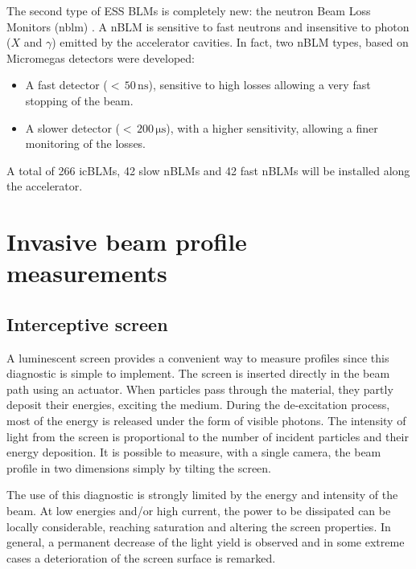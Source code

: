 \begin{refsection}
  The second type of ESS BLMs is completely new: the neutron Beam Loss Monitors (\acrshort{nblm}) \cite{Papaevangelou:HB2018-THA1WE04}.
  A nBLM is sensitive to fast neutrons and insensitive to photon ($X$ and $\gamma$) emitted by the accelerator cavities. In fact, two nBLM types, based on Micromegas detectors \cite{GIOMATARIS199629} were developed:
  \begin{itemize}
    \item A fast detector ($<\,50\,\mathrm{ns}$), sensitive to high losses allowing a very fast stopping of the beam.
    \item A slower detector ($<\,200\,\mathrm{\mu s}$), with a higher sensitivity, allowing a finer monitoring of the losses.
  \end{itemize}

  A total of 266 icBLMs, 42 slow nBLMs and 42 fast nBLMs will be installed along the accelerator.


  \section{Invasive beam profile measurements}
  \subsection{Interceptive screen}
  A luminescent screen provides a convenient way to measure profiles since this diagnostic is simple to implement. The screen is inserted directly in the beam path using an actuator. When particles pass through the material, they partly deposit their energies, exciting the medium. During the de-excitation process, most of the energy is released under the form of visible photons. The intensity of light from the screen is proportional to the number of incident particles and their energy deposition. It is possible to measure, with a single camera, the beam profile in two dimensions simply by tilting the screen.

  The use of this diagnostic is strongly limited by the energy and intensity of the beam. At low energies and/or high current, the power to be dissipated can be locally considerable, reaching saturation and altering the screen properties. In general, a permanent decrease of the light yield is observed \cite{Simon:IBIC2016-MOPG79} and in some extreme cases a deterioration of the screen surface is remarked.


\end{refsection}
